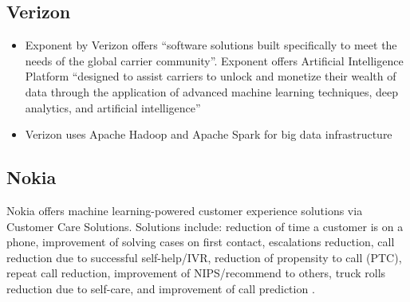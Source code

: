 \documentclass[12pt]{article}
\begin{document}
\subsection{Verizon}
\begin{itemize}
	\item Exponent by Verizon offers “software solutions built specifically to meet the needs of the global carrier community”. Exponent offers Artificial Intelligence Platform “designed to assist carriers to unlock and monetize their wealth of data through the application of advanced machine learning techniques, deep analytics, and artificial intelligence” \cite{verizon1}
	\item Verizon uses Apache Hadoop and Apache Spark for big data infrastructure \cite{verizon2}
\end{itemize}

\subsection{Nokia}
\noindent Nokia offers machine learning-powered customer experience solutions via Customer Care Solutions. Solutions include: reduction of time a customer is on a phone, improvement of solving cases on first contact, escalations reduction, call reduction due to successful self-help/IVR, reduction of propensity to call (PTC), repeat call reduction, improvement of NIPS/recommend to others, truck rolls reduction due to self-care, and improvement of call prediction \cite{nokia}.



%
%
\end{document}
